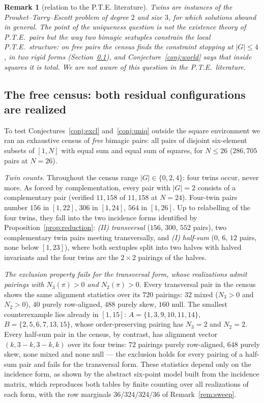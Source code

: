 \documentclass[11pt]{article}
\newtheorem{remark}[theorem]{Remark}
\begin{document}
\begin{remark}[relation to the P.T.E. literature]
Twins are instances of the Prouhet--Tarry--Escott problem of degree
$2$ and size $3$, for which solutions abound in general. The point of
the uniqueness question is not the existence theory of P.T.E.\ pairs
but the way two \emph{bimagic sextuples} constrain the local P.T.E.\
structure: on free pairs the census finds the constraint stopping at
$|G|\le4$, in two rigid forms (Section~\ref{sec:free}), and
Conjecture~\ref{conj:world} says that inside squares it is total. We
are not aware of this question in the P.T.E.\ literature.
\end{remark}

\subsection{The free census: both residual configurations are
realized}\label{sec:free}

To test Conjectures~\ref{conj:excl} and~\ref{conj:uniq} outside the
square environment we ran an exhaustive census of \emph{free} bimagic
pairs: all pairs of disjoint six-element subsets of $[1,N]$ with
equal sum and equal sum of squares, for $N\le 26$ ($286{,}705$ pairs
at $N=26$).

\emph{Twin counts.} Throughout the census range $|G|\in\{0,2,4\}$:
four twins occur, never more. As forced by complementation, every
pair with $|G|=2$ consists of a complementary pair (verified
$11{,}158$ of $11{,}158$ at $N=24$). Four-twin pairs number $156$ in
$[1,22]$, $306$ in $[1,24]$, $564$ in $[1,26]$. Up to relabelling of
the four twins, they fall into the two incidence forms identified by
Proposition~\ref{prop:reduction}:
\emph{(II) transversal} ($156$, $300$, $552$ pairs), two complementary
twin pairs meeting transversally, and \emph{(I) half-sum} ($0$, $6$,
$12$ pairs, none below $[1,23]$), where both sextuples split into two
halves with halved invariants and the four twins are the $2\times2$
pairings of the halves.

\emph{The exclusion property fails for the transversal form, whose
realizations admit pairings with $N_3(\pi)>0$ and $N_2(\pi)>0$.}
Every transversal pair in the census shows the same alignment
statistics over its $720$ pairings: $32$ mixed ($N_3>0$ and
$N_2>0$), $40$ purely row-aligned, $488$ purely skew, $160$ null.
The smallest counterexample lies already in $[1,15]$:
$A=\{1,3,9,10,11,14\}$, $B=\{2,5,6,7,13,15\}$, whose
order-preserving pairing has $N_3=2$ and $N_2=2$. Every half-sum
pair in the census, by contrast, has alignment vector
$(k,3-k,3-k,k)$ over its four twins: $72$ pairings purely
row-aligned, $648$ purely skew, none mixed and none null --- the
exclusion holds for every pairing of a half-sum pair and fails for
the transversal form. These statistics depend only on the incidence
form, as shown by the abstract six-point model built from the
incidence matrix, which reproduces both tables by finite counting
over all realizations of each form, with the row marginals
$36/324/324/36$ of Remark~\ref{rem:sweep}.
\end{document}
